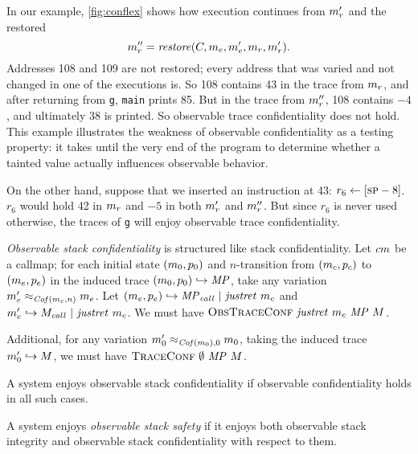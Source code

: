 \documentclass[acmsmall,review,anonymous]{acmart}\settopmatter{printfolios=true,printccs=false,printacmref=false}
\begin{document}
{{      In our example, \cref{fig:conflex} shows how execution continues from
      \(m_r'\) and the restored
      \[m_r'' = \mathit{restore}(C,
      m_e,m_e',m_r,m_r').
      \]
      Addresses 108 and 109
      are not restored; every address that was varied and not changed in one
      of the executions is. So 108 contains 43 in the trace from \(m_r\),
      and after returning from {\tt g}, {\tt main} prints 85. But in the trace
      from \(m_r''\), 108 contains $-4$, and ultimately 38 is printed.
      So observable trace confidentiality does not hold. This example
      illustrates the weakness of observable confidentiality as a testing
      property: it takes until the very end of the program to determine whether
      a tainted value actually influences observable behavior.

      On the other hand, suppose that we inserted an instruction at 43:
      \(r_6 \leftarrow [\textsc{sp}-8]\). \(r_6\) would hold 42 in \(m_r\)
      and $-5$ in both \(m_r'\) and \(m_r''\). But since \(r_6\) is
      never used otherwise, the traces of {\tt g} will enjoy observable trace
      confidentiality.


      {\em Observable stack confidentiality} is structured like stack
      confidentiality. Let \(cm\) be a callmap; for each initial
      state \((m_0, p_0)\) and \(n\)-transition from \((m_c,p_c)\)
      to \((m_e,p_e)\) in the induced trace
      \((m_0,p_0) \hookrightarrow \mathit{MP}\), take any
      variation \(m_e' \approx_{\mathit{Cof}(m_c,n)} m_e\). Let
      \((m_e,p_e) \hookrightarrow \mathit{MP}_{\mathit{call}} ~ | ~
      \mathit{justret}\ m_c\) and \(m_e' \hookrightarrow M_{\mathit{call}} ~ | ~
      \mathit{justret}\ m_c\). We must have \(\text{\sc ObsTraceConf} ~
      \mathit{justret}\ m_c ~ \mathit{MP} ~ M\).

      Additional, for any variation \(m_0' \approx_{\mathit{Cof}(m_0),0}
      m_0\), taking the induced trace  \(m_0' \hookrightarrow
      M\), we must have \(\text{\sc TraceConf} ~ \emptyset ~ \mathit{MP} ~ M\).

      A system enjoys observable stack confidentiality if observable
      confidentiality holds in all such cases.

    A system enjoys {\em observable stack safety}
    if it enjoys both observable stack integrity and
      observable stack confidentiality with respect to them.

}}
\end{document}
